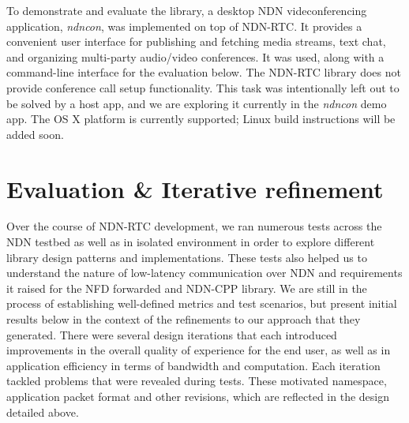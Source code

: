 \documentclass{icn/sig-alternate-2013} %
\newcommand{\ndnrtcName}{NDN-RTC} %
\newcommand{\ndnconName}{\emph{ndncon}}
\begin{document}

To demonstrate and evaluate the library, a desktop NDN videconferencing application, \ndnconName{}, \cite{ndncon} was implemented on top of \ndnrtcName{}. It provides a convenient user interface for publishing and fetching media streams, text chat, and organizing multi-party audio/video conferences. It was used, along with a command-line interface for the evaluation below.
The \ndnrtcName{} library does not provide conference call setup functionality. This task was intentionally left out to be solved by a host app, and we are exploring it currently in the \ndnconName{} demo app.  The OS X platform is currently supported; Linux build instructions will be added soon. %

\section{Evaluation \& Iterative refinement}
\label{sec:eval} 
Over the course of \ndnrtcName{} development, we ran numerous tests across  the NDN testbed as well as in isolated environment in order to explore different library design patterns and implementations. These tests also helped us to understand the nature of low-latency communication over NDN and requirements it raised for the NFD forwarded and NDN-CPP library. We are still in the process of establishing well-defined metrics and test scenarios, but present initial results below in the context of the refinements to our approach that they generated.
There were several  design iterations that each introduced improvements in the overall quality of experience for the end user, as well as in application efficiency in terms of bandwidth and computation. Each iteration tackled problems that were revealed during tests.  These motivated namespace, application packet format and other revisions, which are reflected in the design detailed above.%
\end{document}

